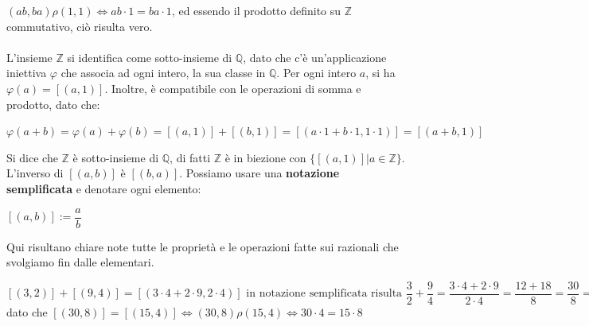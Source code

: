 \documentclass[12pt, letterpaper]{article}
\begin{document}
\( (ab,ba)\rho(1,1)\iff ab\cdot 1 = ba \cdot 1\), ed essendo il prodotto definito su \(\mathbb{Z}\) commutativo, ciò 
risulta vero.\\\hphantom{.}\\
L'insieme \(\mathbb{Z}\) si identifica come sotto-insieme di \(\mathbb{Q}\), dato che c'è un'applicazione iniettiva \(\varphi\)
che associa ad ogni intero, la sua classe in \(\mathbb{Q}\). Per ogni intero \(a\), si ha \(\varphi(a)=[(a,1)]\). Inoltre, è 
compatibile con le operazioni di somma e prodotto, dato che:\begin{center} \(\varphi(a+b)=\varphi(a)+\varphi(b)=[(a,1)]+[(b,1)]=
[(a\cdot1 + b\cdot 1,1\cdot 1)]=[(a+b,1)] \)\end{center}
Si dice che \(\mathbb{Z}\) è sotto-insieme di \(\mathbb{Q}\), di fatti \(\mathbb{Z}\) è in biezione con 
\(\{[(a,1)]|a\in \mathbb{Z}\}\). L'inverso di \([(a,b)]\) è \([(b,a)]\). Possiamo usare una \textbf{notazione semplificata} e 
denotare ogni elemento:\begin{center} \([(a,b)]:=\dfrac{a}{b}\)\end{center} Qui risultano chiare note tutte le proprietà e le operazioni fatte sui razionali che 
svolgiamo fin dalle elementari. \begin{center}
    \(
        [(3,2)]+[(9,4)]=[(3\cdot4 + 2\cdot 9,2\cdot 4)] \text{ in notazione semplificata risulta } \dfrac{3}{2}+
        \dfrac{9}{4} =\dfrac{3\cdot 4 + 2\cdot 9}{2\cdot 4}=\dfrac{12+18}{8}=\dfrac{30}{8}=\dfrac{15}{4}
    \) dato che \([(30,8)]=[(15,4)]\iff(30,8)\rho(15,4)\iff 30\cdot4=15\cdot8\)
\end{center}
\end{document}
